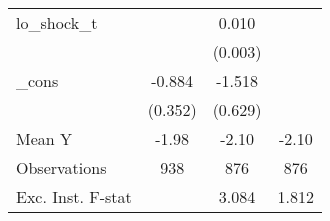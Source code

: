 {\begin{tabular}{l*{3}{c}}
\addlinespace
lo\_shock\_t  &                     &       0.010\sym{***}&                     \\
            &                     &     (0.003)         &                     \\
\addlinespace
\_cons      &      -0.884\sym{**} &      -1.518\sym{**} &                     \\
            &     (0.352)         &     (0.629)         &                     \\
\midrule
Mean Y      &       -1.98         &       -2.10         &       -2.10         \\
Observations&         938         &         876         &         876         \\
Exc. Inst. F-stat&                     &       3.084         &       1.812         \\
\bottomrule
\end{tabular}
}
